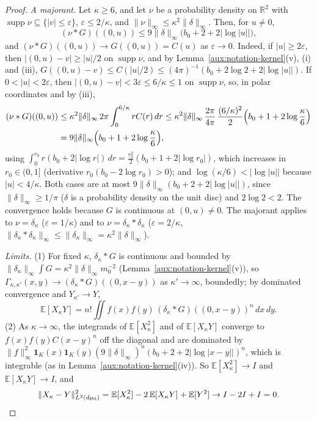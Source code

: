 \documentclass[11pt,a4paper]{article}
\theoremstyle{plain}
\theoremstyle{definition}
\theoremstyle{plain}
\theoremstyle{definition}
\newcommand{\R}{\mathbb{R}}
\newcommand{\E}{\mathbb{E}}
\DeclareMathOperator{\supp}{supp}
\newcommand{\dmu}{d\mu_0}
\begin{document}
\begin{proof}
\emph{A majorant.}  Let $\kappa\ge6$, and let $\nu$ be a probability density on $\R^2$ with
$\supp\nu\subseteq\{|v|\le\varepsilon\}$, $\varepsilon\le2/\kappa$, and
$\|\nu\|_\infty\le\kappa^2\|\delta\|_\infty$.  Then, for $u\ne0$,
\[
 (\nu*G)((0,u))\le9\|\delta\|_\infty\bigl(b_0+2+2|\log|u||\bigr),
\]
and $(\nu*G)((0,u))\to G((0,u))=C(u)$ as $\varepsilon\to0$.  Indeed, if $|u|\ge2\varepsilon$, then
$|(0,u)-v|\ge|u|/2$ on $\supp\nu$, and by Lemma~\ref{aux:notation-kernel}(v), (i) and (iii),
$G((0,u)-v)\le C(|u|/2)\le(4\pi)^{-1}(b_0+2\log2+2|\log|u||)$.  If $0<|u|<2\varepsilon$, then
$|(0,u)-v|<3\varepsilon\le6/\kappa\le1$ on $\supp\nu$, so, in polar coordinates and by (iii),
\begin{align*}
 (\nu*G)((0,u))&\le\kappa^2\|\delta\|_\infty\,2\pi\int_0^{6/\kappa}rC(r)\,dr
 \le\kappa^2\|\delta\|_\infty\,\frac{2\pi}{4\pi}\,\frac{(6/\kappa)^2}{2}
 \Bigl(b_0+1+2\log\frac\kappa6\Bigr)\\
 &=9\|\delta\|_\infty\Bigl(b_0+1+2\log\frac\kappa6\Bigr),
\end{align*}
using $\int_0^{r_0}r(b_0+2|\log r|)\,dr=\frac{r_0^2}2(b_0+1+2|\log r_0|)$, which increases in
$r_0\in(0,1]$ (derivative $r_0(b_0-2\log r_0)>0$); and $\log(\kappa/6)<|\log|u||$ because
$|u|<4/\kappa$.  Both cases are at most $9\|\delta\|_\infty(b_0+2+2|\log|u||)$, since
$\|\delta\|_\infty\ge1/\pi$ ($\delta$ is a probability density on the unit disc) and $2\log2<2$.
The convergence holds because $G$ is continuous at $(0,u)\ne0$.  The majorant applies to
$\nu=\delta_\kappa$ ($\varepsilon=1/\kappa$) and to $\nu=\delta_\kappa*\delta_\kappa$
($\varepsilon=2/\kappa$, $\|\delta_\kappa*\delta_\kappa\|_\infty\le\|\delta_\kappa\|_\infty=
\kappa^2\|\delta\|_\infty$).

\emph{Limits.}  (1) For fixed $\kappa$, $\delta_\kappa*G$ is continuous and bounded by
$\|\delta_\kappa\|_\infty\int G=\kappa^2\|\delta\|_\infty m_0^{-2}$
(Lemma~\ref{aux:notation-kernel}(v)), so $\Gamma_{\kappa,\kappa'}(x,y)\to(\delta_\kappa*G)((0,x-y))$
as $\kappa'\to\infty$, boundedly; by dominated convergence and $Y_{\kappa'}\to Y$,
\[
 \E[X_\kappa Y]=n!\iint f(x)f(y)\,(\delta_\kappa*G)((0,x-y))^n\,dx\,dy .
\]
(2) As $\kappa\to\infty$, the integrands of $\E[X_\kappa^2]$ and of $\E[X_\kappa Y]$ converge to
$f(x)f(y)C(x-y)^n$ off the diagonal and are dominated by
$\|f\|_\infty^2\mathbf 1_K(x)\mathbf 1_K(y)(9\|\delta\|_\infty)^n(b_0+2+2|\log|x-y||)^n$, which is
integrable (as in Lemma~\ref{aux:notation-kernel}(iv)).  So $\E[X_\kappa^2]\to I$ and
$\E[X_\kappa Y]\to I$, and
\[
 \|X_\kappa-Y\|_{L^2(\dmu)}^2=\E[X_\kappa^2]-2\,\E[X_\kappa Y]+\E[Y^2]\to I-2I+I=0 .\qedhere
\]
\end{proof}
\end{document}
